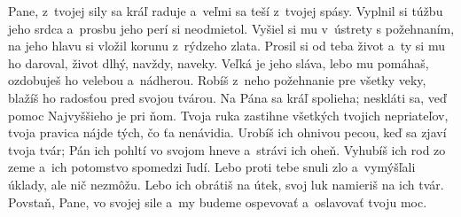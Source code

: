 Pane, z~tvojej sily sa kráľ raduje
a~veľmi sa teší z~tvojej spásy.
\versseparator
Vyplnil si túžbu jeho srdca
a~prosbu jeho perí si neodmietol.
\versseparator
Vyšiel si mu v~ústrety s požehnaním,
na jeho hlavu si vložil korunu z~rýdzeho zlata.
\versseparator
Prosil si od teba život a~ty si mu ho daroval,
život dlhý, navždy, naveky.
\versseparator
Veľká je jeho sláva, lebo mu pomáhaš,
ozdobuješ ho velebou a~nádherou.
\versseparator
Robíš z~neho požehnanie pre všetky veky,
blažíš ho radosťou pred svojou tvárou.
\versseparator
Na Pána sa kráľ spolieha;
neskláti sa, veď pomoc Najvyššieho je pri ňom.
\versseparator
Tvoja ruka zastihne všetkých tvojich nepriateľov,
tvoja pravica nájde tých, čo ťa nenávidia.
\versseparator
Urobíš ich ohnivou pecou, keď sa zjaví tvoja tvár;
Pán ich pohltí vo svojom hneve
a~strávi ich oheň.
\versseparator
Vyhubíš ich rod zo zeme
a~ich potomstvo spomedzi ľudí.
\versseparator
Lebo proti tebe snuli zlo
a~vymýšľali úklady, ale nič nezmôžu.
\versseparator
Lebo ich obrátiš na útek,
svoj luk namieriš na ich tvár.
\versseparator
Povstaň, Pane, vo svojej sile
a~my budeme ospevovať a~oslavovať tvoju moc.
